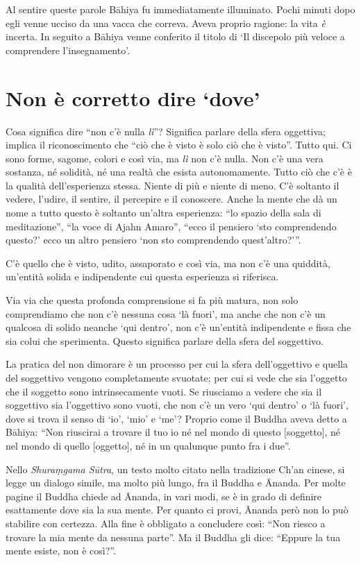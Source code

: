 Al sentire queste parole Bāhiya fu immediatamente illuminato. Pochi minuti dopo egli venne ucciso da una vacca che correva. Aveva proprio ragione: la vita \textit{è} incerta. In seguito a Bāhiya venne conferito il titolo di `Il discepolo più veloce a comprendere l'insegnamento'. 

\section*{Non \`e corretto dire `dove'}

Cosa significa dire ``non c'è nulla \textit{lì}''? Significa parlare della sfera oggettiva; implica il riconoscimento che ``ciò che è visto è solo ciò che è visto''. Tutto qui. Ci sono forme, sagome, colori e così via, ma \textit{lì} non c'è nulla. Non c'è una vera sostanza, né solidità, né una realtà che esista autonomamente. Tutto ciò che c'è è la qualità dell'esperienza stessa. Niente di più e niente di meno. C'è soltanto il vedere, l'udire, il sentire, il percepire e il conoscere. Anche la mente che dà un nome a tutto questo è soltanto un'altra esperienza: ``lo spazio della sala di meditazione'', ``la voce di Ajahn Amaro'', ``ecco il pensiero `sto comprendendo questo?' ecco un altro pensiero `non sto comprendendo quest'altro?'\thinspace''.

C'è quello che è visto, udito, assaporato e così via, ma non c'è una quiddità, un'entità solida e indipendente cui questa esperienza si riferisca. 

Via via che questa profonda comprensione si fa più matura, non solo comprendiamo che non c'è nessuna cosa `là fuori', ma anche che non c'è un qualcosa di solido neanche `qui dentro', non c'è un'entità indipendente e fissa che sia colui che sperimenta. Questo significa parlare della sfera del soggettivo.

La pratica del non dimorare è un processo per cui la sfera dell'oggettivo e quella del soggettivo vengono completamente svuotate; per cui si vede che sia l'oggetto che il soggetto sono intrinsecamente vuoti. Se riusciamo a vedere che sia il soggettivo sia l'oggettivo sono vuoti, che non c'è un vero `qui dentro' o `là fuori', dove si trova il senso di `io', `mio' e `me'? Proprio come il Buddha aveva detto a Bāhiya: ``Non riuscirai a trovare il tuo io né nel mondo di questo $[$soggetto$]$, né nel mondo di quello $[$oggetto$]$, né in un qualunque punto fra i due''.

Nello \textit{Shuraṃgama Sūtra}, un testo molto citato nella tradizione Ch'an cinese, si legge un dialogo simile, ma molto più lungo, fra il Buddha e \=Ananda. Per molte pagine il Buddha chiede ad \=Ananda, in vari modi, se è in grado di definire esattamente dove sia la sua mente. Per quanto ci provi, \=Ananda però non lo può stabilire con certezza. Alla fine è obbligato a concludere così: ``Non riesco a trovare la mia mente da nessuna parte''. Ma il Buddha gli dice: ``Eppure la tua mente esiste, non è così?''.

